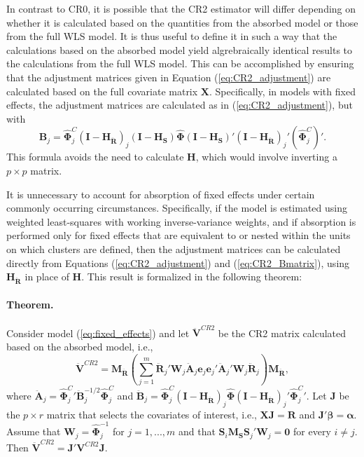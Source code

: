 \documentclass[12pt]{article}\usepackage[]{graphicx}\usepackage[]{color}
\newcommand{\bm}{\mathbf}
\newcommand{\bs}{\boldsymbol}
\begin{document}
In contrast to CR0, it is possible that the CR2 estimator will differ depending on whether it is calculated based on the quantities from the absorbed model or those from the full WLS model. 
It is thus useful to define it in such a way that the calculations based on the absorbed model yield algrebraically identical results to the calculations from the full WLS model. 
This can be accomplished by ensuring that the adjustment matrices given in Equation (\ref{eq:CR2_adjustment}) are calculated based on the full covariate matrix $\bm{X}$. Specifically, in models with fixed effects, the adjustment matrices are calculated as in (\ref{eq:CR2_adjustment}), but with 
\begin{equation}
\label{eq:CR2_panel_adjustment}
\bm{B}_j = \hat{\bs\Phi}_j^C\left(\bm{I} - \bm{H_{\ddot{R}}}\right)_j \left(\bm{I} - \bm{H_S}\right) \hat{\bs\Phi} \left(\bm{I} - \bm{H_S}\right)' \left(\bm{I} - \bm{H_{\ddot{R}}}\right)_j' \left(\hat{\bs\Phi}_j^C\right)'.
\end{equation}
This formula avoids the need to calculate $\bm{H}$, which would involve inverting a $p \times p$ matrix. 

It is unnecessary to account for absorption of fixed effects under certain commonly occurring circumstances. Specifically, if the model is estimated using weighted least-squares with working inverse-variance weights, and if absorption is performed only for fixed effects that are equivalent to or nested within the units on which clusters are defined, then the adjustment matrices can be calculated directly from Equations (\ref{eq:CR2_adjustment}) and (\ref{eq:CR2_Bmatrix}), using $\bm{H_{\ddot{R}}}$ in place of $\bm{H}$. This result is formalized in the following theorem:

\paragraph{Theorem.} Consider model (\ref{eq:fixed_effects}) and let $\bm{\ddot{V}}^{CR2}$ be the CR2 matrix calculated based on the absorbed model, i.e., 
\[
\bm{\ddot{V}}^{CR2} = \bm{M_{\ddot{R}}}\left(\sum_{j=1}^m \bm{\ddot{R}}_j'\bm{W}_j \bm{\ddot{A}}_j \bm{e}_j \bm{e}_j' \bm{\ddot{A}}_j' \bm{W}_j \bm{\ddot{R}}_j\right) \bm{M_{\ddot{R}}},
\]
where $\bm{\ddot{A}}_j = {\bs{\hat\Phi}_j^C}' \bm{\ddot{B}}_j^{-1/2}\hat{\bs\Phi}_j^C$ and $\bm{\ddot{B}}_j = \hat{\bs\Phi}_j^C\left(\bm{I} - \bm{H_{\ddot{R}}}\right)_j \hat{\bs\Phi} \left(\bm{I} - \bm{H_{\ddot{R}}}\right)_j' {\bs{\hat\Phi}_j^C}'$.
Let $\bm{J}$ be the $p \times r$ matrix that selects the covariates of interest, i.e., $\bm{X}\bm{J} = \bm{R}$ and $\bm{J}'\bs\beta = \bs\alpha$. 
Assume that $\bm{W}_j = \bs{\hat\Phi}_j^{-1}$ for $j = 1,...,m$ and that $\bm{S}_i \bm{M_S}\bm{S}_j'\bm{W}_j = \bm{0}$ for every $i \neq j$. Then $\bm{\ddot{V}}^{CR2} = \bm{J}'\bm{V}^{CR2}\bm{J}$.
\end{document}
